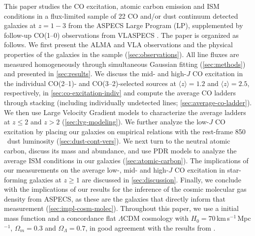 \documentclass[twocolumn]{aastex62}
\newcommand{\avg}[1]{\ensuremath{\langle #1 \rangle}}
\begin{document}
This paper studies the CO excitation, atomic carbon emission and ISM conditions
in a flux-limited sample of 22 CO and/or dust continuum detected galaxies at
$z=1-3$ from the ASPECS Large Program (LP), supplemented by follow-up CO(1--0)
observations from VLASPECS \citep{Riechers2020b}.  The paper is organized as
follows.  We first present the ALMA and VLA observations and the physical
properties of the galaxies in the sample (\autoref{sec:observations}).  All
line fluxes are measured homogeneously through simultaneous Gaussian fitting
(\autoref{sec:methods}) and presented in \autoref{sec:results}.  We discuss the
mid- and high-$J$ CO excitation in the individual CO(2--1)- and
CO(3--2)-selected sources at $\avg{z}=1.2$ and $\avg{z}=2.5$, respectively, in
\autoref{sec:co-excitation-indiv} and compute the average CO ladders through
stacking (including individually undetected lines;
\autoref{sec:average-co-ladder}).  We then use Large Velocity Gradient models
to characterize the average ladders at $z\le2$ and $z>2$
(\autoref{sec:lvg-modeling}).  We further analyze the low-$J$ CO excitation by
placing our galaxies on empirical relations with the rest-frame 850\,\micron\
dust luminosity (\autoref{sec:dust-cont-vers}).  We next turn to the neutral
atomic carbon, discuss its mass and abundance, and use PDR models to analyze
the average ISM conditions in our galaxies (\autoref{sec:atomic-carbon}).  The
implications of our measurements on the average low-, mid- and high-$J$ CO
excitation in star-forming galaxies at $z\ge1$ are discussed in
\autoref{sec:discussion}.  Finally, we conclude with the implications of our
results for the inference of the cosmic molecular gas density from ASPECS, as
these are the galaxies that directly inform that measurement
(\autoref{sec:impl-cosm-molec}).  Throughout this paper, we use a
\cite{Chabrier2003} initial mass function and a concordance flat $\Lambda$CDM
cosmology with $H_{0} = 70$\,km\,s$^{-1}$\,Mpc$^{-1}$, $\Omega_{m} = 0.3$ and
$\Omega_{\Lambda} = 0.7$, in good agreement with the results from
\cite{PlanckCollaboration2015}.
\end{document}
